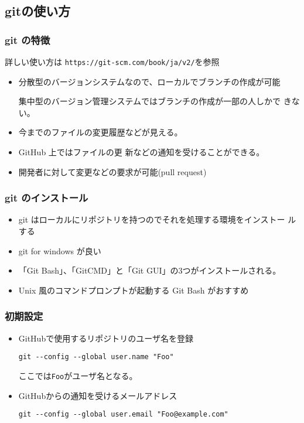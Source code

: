 \subsection{gitの使い方}
\begin{frame}[containsverbatim]
 \frametitle{git の特徴}
詳しい使い方は \Verb+https://git-scm.com/book/ja/v2/+を参照
\begin{itemize}
 \item 分散型のバージョンシステムなので、ローカルでブランチの作成が可能

       集中型のバージョン管理システムではブランチの作成が一部の人しかで
       きない。
 \item 今までのファイルの変更履歴などが見える。
 \item  GitHub 上ではファイルの更
       新などの通知を受けることができる。
 \item 開発者に対して変更などの要求が可能(pull request)
\end{itemize}
\end{frame}
\begin{frame}[containsverbatim]
 \frametitle{git のインストール}
 \begin{itemize}
  \item git はローカルにリポジトリを持つのでそれを処理する環境をインストー
        ルする
  \item git for windows が良い
  \item 「Git Bash」、「GitCMD」と「Git GUI」の3つがインストールされる。
  \item Unix 風のコマンドプロンプトが起動する Git Bash がおすすめ
 \end{itemize}
\end{frame}
\begin{frame}[containsverbatim]
 \frametitle{初期設定}
 \begin{itemize}
  \item GitHubで使用するリポジトリのユーザ名を登録

        \Verb+git --config --global user.name "Foo"+

ここでは\Verb+Foo+がユーザ名となる。
  \item GitHubからの通知を受けるメールアドレス

        \Verb+git --config --global user.email "Foo@example.com"+
 \end{itemize}
 \end{frame}
